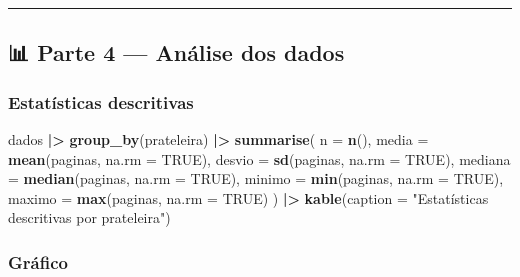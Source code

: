 \documentclass[
]{article}
\newenvironment{Shaded}{\begin{snugshade}}{\end{snugshade}}
\newcommand{\AttributeTok}[1]{\textcolor[rgb]{0.13,0.29,0.53}{#1}}
\newcommand{\ConstantTok}[1]{\textcolor[rgb]{0.56,0.35,0.01}{#1}}
\newcommand{\FunctionTok}[1]{\textcolor[rgb]{0.13,0.29,0.53}{\textbf{#1}}}
\newcommand{\NormalTok}[1]{#1}
\newcommand{\SpecialCharTok}[1]{\textcolor[rgb]{0.81,0.36,0.00}{\textbf{#1}}}
\newcommand{\StringTok}[1]{\textcolor[rgb]{0.31,0.60,0.02}{#1}}
\begin{document}
\begin{center}\rule{0.5\linewidth}{0.5pt}\end{center}

\subsection{📊 Parte 4 --- Análise dos
dados}\label{parte-4-anuxe1lise-dos-dados}

\subsubsection{Estatísticas
descritivas}\label{estatuxedsticas-descritivas}

\begin{Shaded}
\begin{Highlighting}[]
\NormalTok{dados }\SpecialCharTok{|\textgreater{}}
  \FunctionTok{group\_by}\NormalTok{(prateleira) }\SpecialCharTok{|\textgreater{}}
  \FunctionTok{summarise}\NormalTok{(}
    \AttributeTok{n =} \FunctionTok{n}\NormalTok{(),}
    \AttributeTok{media =} \FunctionTok{mean}\NormalTok{(paginas, }\AttributeTok{na.rm =} \ConstantTok{TRUE}\NormalTok{),}
    \AttributeTok{desvio =} \FunctionTok{sd}\NormalTok{(paginas, }\AttributeTok{na.rm =} \ConstantTok{TRUE}\NormalTok{),}
    \AttributeTok{mediana =} \FunctionTok{median}\NormalTok{(paginas, }\AttributeTok{na.rm =} \ConstantTok{TRUE}\NormalTok{),}
    \AttributeTok{minimo =} \FunctionTok{min}\NormalTok{(paginas, }\AttributeTok{na.rm =} \ConstantTok{TRUE}\NormalTok{),}
    \AttributeTok{maximo =} \FunctionTok{max}\NormalTok{(paginas, }\AttributeTok{na.rm =} \ConstantTok{TRUE}\NormalTok{)}
\NormalTok{  ) }\SpecialCharTok{|\textgreater{}}
  \FunctionTok{kable}\NormalTok{(}\AttributeTok{caption =} \StringTok{"Estatísticas descritivas por prateleira"}\NormalTok{)}
\end{Highlighting}
\end{Shaded}

\subsubsection{Gráfico}\label{gruxe1fico}
\end{document}
